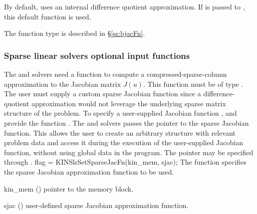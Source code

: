 {
  By default, {\kinband} uses an internal difference quotient approximation.
  If  is passed to , this default function is used.

  The function type  is described in \S\ref{ss:bjacFn}.
}

\subsubsection{Sparse linear solvers optional input functions}\label{sss:optin_sls}
The 
{\kinklu} and {\kinsuperlumt} solvers need a function to compute a
compressed-sparse-column approximation to the Jacobian matrix $J(u)$.
This function must be of type .  The user must
supply a custom sparse Jacobian function since a difference-quotient
approximation would not leverage the underlying sparse matrix
structure of the problem.  To specify a user-supplied Jacobian
function , {\kinklu} and {\kinsuperlumt} provide the function
. The {\kinklu} and {\kinsuperlumt} solvers
passes the pointer  to the sparse Jacobian
function. This allows the user to create an arbitrary structure with
relevant problem data and access it during the execution of the
user-supplied Jacobian function, without using global data in the
program.  The pointer  may be specified through
.
{
  flag = KINSlsSetSparseJacFn(kin\_mem, sjac);
}
{
  The function  specifies the sparse Jacobian
  approximation function to be used.
}
{
  \begin{args}
  \item[kin\_mem] ()
    pointer to the {\kinsol} memory block.
  \item[sjac] ()
    user-defined sparse Jacobian approximation function.
  \end{args}
}
